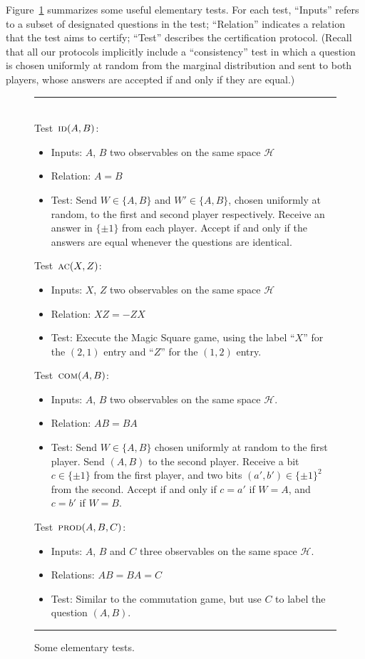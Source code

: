 \documentclass[11pt]{article}
\theoremstyle{remark}
\theoremstyle{definition}
\newcommand{\mH}{\mathcal{H}}
\newcommand{\prodt}{\textsc{prod}}
\newcommand{\comt}{\textsc{com}}
\newcommand{\act}{\textsc{ac}}
\newcommand{\idt}{\textsc{id}}
\begin{document}
Figure~\ref{fig:elementary} summarizes some useful elementary tests. For each test, ``Inputs'' refers to a subset of designated questions in the test; ``Relation'' indicates a relation that the test aims to certify; ``Test'' describes the certification protocol. (Recall that all our protocols implicitly include a ``consistency'' test in which a question is chosen uniformly at random from the marginal distribution and sent to both players, whose answers are accepted if and only if they are equal.)

\begin{figure}[H]
\rule[1ex]{\textwidth}{0.5pt}\\
Test~$\idt(A,B)$:
\begin{itemize}
    \item Inputs: $A$, $B$ two observables on the same space $\mH$
    \item Relation: $A=B$
    \item Test: Send $W \in \{A,B\}$ and $W'\in\{A,B\}$, chosen uniformly at random, to the first and second player respectively. Receive an answer in $\{\pm 1\}$ from each player. Accept if and only if the answers are equal whenever the questions are identical. 
\end{itemize}
Test~$\act(X,Z)$:
\begin{itemize}
    \item Inputs: $X$, $Z$ two observables on the same space $\mH$
    \item Relation: $XZ=-ZX$
    \item Test: Execute the Magic Square game, using the label ``$X$'' for the $(2,1)$ entry and ``$Z$'' for the $(1,2)$ entry.  
\end{itemize}
Test~$\comt(A,B)$:
\begin{itemize}
    \item Inputs: $A$, $B$ two observables on the same space $\mH$.
    \item Relation: $AB=BA$
    \item Test: Send $W\in\{A,B\}$ chosen uniformly at random to the first player. Send $(A,B)$ to the second player. Receive a bit $c\in\{\pm 1\}$ from the first player, and two bits $(a',b')\in\{\pm 1\}^2$ from the second. Accept if and only if $c=a'$ if $W=A$, and $c=b'$ if $W=B$. 
\end{itemize}
Test~$\prodt(A,B,C)$:
\begin{itemize}
    \item Inputs: $A$, $B$ and $C$ three observables on the same space $\mH$.
    \item Relations: $AB=BA=C$
    \item Test: Similar to the commutation game, but use $C$ to label the question $(A,B)$.
\end{itemize}
\rule[2ex]{\textwidth}{0.5pt}\vspace{-1cm}
\caption{Some elementary tests.}
\label{fig:elementary}
\end{figure}
\end{document}
